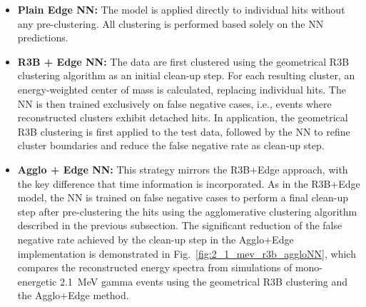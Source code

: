 \documentclass[review,sort&compress]{elsarticle}
\begin{document}
\begin{itemize}
    \item \textbf{Plain Edge NN:} The model is applied directly to individual hits without any pre-clustering. All clustering is performed based solely on the NN predictions.
    \item \textbf{R3B + Edge NN:} The data are first clustered using the geometrical R3B clustering algorithm as an initial clean-up step. For each resulting cluster, an energy-weighted center of mass is calculated, replacing individual hits. The  NN is then trained exclusively on false negative cases, i.e., events where reconstructed clusters exhibit detached hits. In application, the geometrical R3B clustering is first applied to the test data, followed by the NN to refine cluster boundaries and reduce the false negative rate as clean-up step.
    \item \textbf{Agglo + Edge NN:} This strategy mirrors the R3B+Edge approach, with the key difference that time information is incorporated. As in the R3B+Edge model, the NN is trained on false negative cases to perform a final clean-up step after pre-clustering the hits using the agglomerative clustering algorithm described in the previous subsection. The significant reduction of the false negative rate achieved by the clean-up step in the Agglo+Edge implementation is demonstrated in Fig.~\ref{fig:2_1_mev_r3b_aggloNN}, which compares the reconstructed energy spectra from simulations of mono-energetic 2.1~MeV gamma events using the geometrical R3B clustering and the Agglo+Edge method.
\end{itemize}
\end{document}
